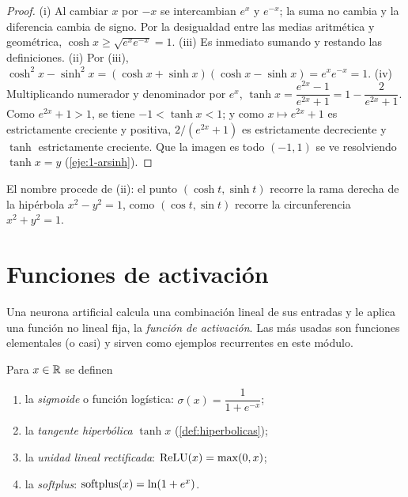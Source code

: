 \begin{proof}
(i) Al cambiar $x$ por $-x$ se intercambian $e^{x}$ y $e^{-x}$; la suma no cambia y la diferencia cambia de signo. Por la desigualdad entre las medias aritmética y geométrica, $\cosh x\ge\sqrt{e^{x}e^{-x}}=1$. (iii) Es inmediato sumando y restando las definiciones. (ii) Por (iii), $\cosh^{2}x-\sinh^{2}x=(\cosh x+\sinh x)(\cosh x-\sinh x)=e^{x}e^{-x}=1$. (iv) Multiplicando numerador y denominador por $e^{x}$, $\tanh x=\dfrac{e^{2x}-1}{e^{2x}+1}=1-\dfrac{2}{e^{2x}+1}$. Como $e^{2x}+1>1$, se tiene $-1<\tanh x<1$; y como $x\mapsto e^{2x}+1$ es estrictamente creciente y positiva, $2/(e^{2x}+1)$ es estrictamente decreciente y $\tanh$ estrictamente creciente. Que la imagen es todo $(-1,1)$ se ve resolviendo $\tanh x=y$ (\cref{eje:1-arsinh}).
\end{proof}

El nombre procede de (ii): el punto $(\cosh t,\sinh t)$ recorre la rama derecha de la hipérbola $x^{2}-y^{2}=1$, como $(\cos t,\sin t)$ recorre la circunferencia $x^{2}+y^{2}=1$.

\section{Funciones de activación}

Una neurona artificial calcula una combinación lineal de sus entradas y le aplica una función no lineal fija, la \emph{función de activación}. Las más usadas son funciones elementales (o casi) y sirven como ejemplos recurrentes en este módulo.

\begin{definicion}\label{def:activaciones}
Para $x\in\mathbb{R}$ se definen
\begin{enumerate}
  \item la \emph{sigmoide} o función logística: $\sigma(x)=\dfrac{1}{1+e^{-x}}$;
  \item la \emph{tangente hiperbólica} $\tanh x$ (\cref{def:hiperbolicas});
  \item la \emph{unidad lineal rectificada}: $\operatorname{ReLU}(x)=\max(0,x)$;
  \item la \emph{softplus}: $\operatorname{softplus}(x)=\ln(1+e^{x})$.
\end{enumerate}
\end{definicion}

